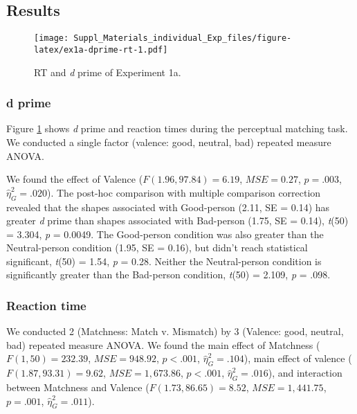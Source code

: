 \documentclass[
  english,
  man]{apa6}
\begin{document}
\hypertarget{results}{%
\subsection{Results}\label{results}}

\begin{figure}
\centering
\texttt{[image: Suppl\_Materials\_individual\_Exp\_files/figure-latex/ex1a-dprime-rt-1.pdf]}
\caption{\label{fig:ex1a-dprime-rt}RT and \emph{d} prime of Experiment 1a.}
\end{figure}

\hypertarget{d-prime}{%
\subsubsection{d prime}\label{d-prime}}

Figure \ref{fig:ex1a-dprime-rt} shows \emph{d} prime and reaction times during the perceptual matching task. We conducted a single factor (valence: good, neutral, bad) repeated measure ANOVA.

We found the effect of Valence (\(F(1.96, 97.84) = 6.19\), \(\mathit{MSE} = 0.27\), \(p = .003\), \(\hat{\eta}^2_G = .020\)). The post-hoc comparison with multiple comparison correction revealed that the shapes associated with Good-person (2.11, SE = 0.14) has greater \emph{d} prime than shapes associated with Bad-person (1.75, SE = 0.14), \emph{t}(50) = 3.304, \emph{p} = 0.0049. The Good-person condition was also greater than the Neutral-person condition (1.95, SE = 0.16), but didn't reach statistical significant, \emph{t}(50) = 1.54, \emph{p} = 0.28. Neither the Neutral-person condition is significantly greater than the Bad-person condition, \emph{t}(50) = 2.109, \emph{p} = .098.

\hypertarget{reaction-time}{%
\subsubsection{Reaction time}\label{reaction-time}}

We conducted 2 (Matchness: Match v. Mismatch) by 3 (Valence: good, neutral, bad) repeated measure ANOVA. We found the main effect of Matchness (\(F(1, 50) = 232.39\), \(\mathit{MSE} = 948.92\), \(p < .001\), \(\hat{\eta}^2_G = .104\)), main effect of valence (\(F(1.87, 93.31) = 9.62\), \(\mathit{MSE} = 1,673.86\), \(p < .001\), \(\hat{\eta}^2_G = .016\)), and interaction between Matchness and Valence (\(F(1.73, 86.65) = 8.52\), \(\mathit{MSE} = 1,441.75\), \(p = .001\), \(\hat{\eta}^2_G = .011\)).
\end{document}
